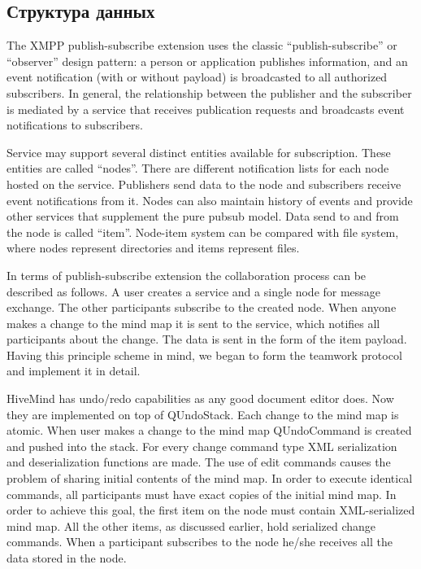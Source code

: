 \subsection{Структура данных}

The XMPP publish-subscribe extension uses the classic ``publish-subscribe'' or
``observer'' design pattern: a person or application publishes information, and
an event notification (with or without payload) is broadcasted to all authorized
subscribers. In general, the relationship between the publisher and the
subscriber is mediated by a service that receives publication requests and
broadcasts event notifications to subscribers.

Service may support several distinct entities available for subscription. These
entities are called ``nodes''. There are different notification lists for each
node hosted on the service. Publishers send data to the node and subscribers
receive event notifications from it. Nodes can also maintain history of events
and provide other services that supplement the pure pubsub model. Data send to
and from the node is called ``item''. Node-item system can be compared with file
system, where nodes represent directories and items represent files.

In terms of publish-subscribe extension the collaboration process can be
described as follows. A user creates a service and a single node for message
exchange. The other participants subscribe to the created node. When anyone
makes a change to the mind map it is sent to the service, which notifies all
participants about the change. The data is sent in the form of the item
payload. Having this principle scheme in mind, we began to form the teamwork
protocol and implement it in detail.

HiveMind has undo/redo capabilities as any good document editor does. Now they
are implemented on top of QUndoStack. Each change to the mind map is atomic.
When user makes a change to the mind map QUndoCommand is created and pushed into
the stack. For every change command type XML serialization and deserialization
functions are made.  The use of edit commands causes the problem of sharing
initial contents of the mind map. In order to execute identical commands, all
participants must have exact copies of the initial mind map. In order to achieve
this goal, the first item on the node must contain XML-serialized mind map. All
the other items, as discussed earlier, hold serialized change commands.  When a
participant subscribes to the node he/she receives all the data stored in the
node.

